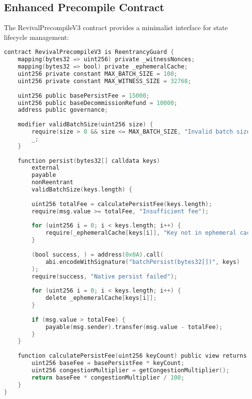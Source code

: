 \documentclass{article}
\begin{document}
\subsection{Enhanced Precompile Contract}

The RevivalPrecompileV3 contract provides a minimalist interface for state lifecycle management:

\begin{lstlisting}[language=C,caption={RevivalPrecompileV3 Core Interface},label={lst:precompile}]
contract RevivalPrecompileV3 is ReentrancyGuard {
    mapping(bytes32 => uint256) private _witnessNonces;
    mapping(bytes32 => bool) private _ephemeralCache;
    uint256 private constant MAX_BATCH_SIZE = 100;
    uint256 private constant MAX_WITNESS_SIZE = 32768;
    
    uint256 public basePersistFee = 15000;
    uint256 public baseDecommissionRefund = 10000;
    address public governance;
    
    modifier validBatchSize(uint256 size) {
        require(size > 0 && size <= MAX_BATCH_SIZE, "Invalid batch size");
        _;
    }
    
    function persist(bytes32[] calldata keys) 
        external 
        payable 
        nonReentrant 
        validBatchSize(keys.length) {
        
        uint256 totalFee = calculatePersistFee(keys.length);
        require(msg.value >= totalFee, "Insufficient fee");
        
        for (uint256 i = 0; i < keys.length; i++) {
            require(_ephemeralCache[keys[i]], "Key not in ephemeral cache");
        }
        
        (bool success, ) = address(0x0A).call(
            abi.encodeWithSignature("batchPersist(bytes32[])", keys)
        );
        require(success, "Native persist failed");
        
        for (uint256 i = 0; i < keys.length; i++) {
            delete _ephemeralCache[keys[i]];
        }
        
        if (msg.value > totalFee) {
            payable(msg.sender).transfer(msg.value - totalFee);
        }
    }
    
    function calculatePersistFee(uint256 keyCount) public view returns (uint256) {
        uint256 baseFee = basePersistFee * keyCount;
        uint256 congestionMultiplier = getCongestionMultiplier();
        return baseFee * congestionMultiplier / 100;
    }
}
\end{lstlisting}
\end{document}
